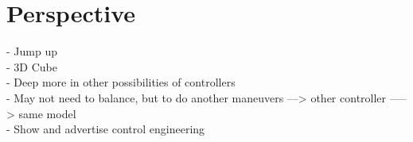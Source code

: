 \chapter{Perspective}

- Jump up\\
- 3D Cube\\
- Deep more in other possibilities of controllers\\
- May not need to balance, but to do another maneuvers ---> other controller -----> same model\\
- Show and advertise control engineering \\
